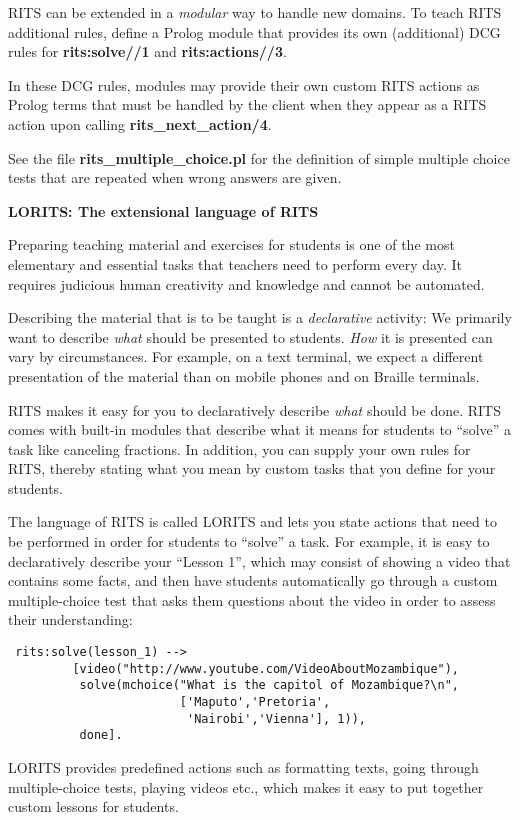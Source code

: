 \documentclass[a4paper,11pt]{article}
\begin{document}
RITS can be extended in a \textit{modular} way to handle new domains.
To teach RITS additional rules, define a Prolog module that provides
its own (additional) DCG rules for \textbf{rits:solve//1} and
\textbf{rits:actions//3}. 

In these DCG rules, modules may provide their own custom RITS actions
as Prolog terms that must be handled by the client when they appear as
a RITS action upon calling \textbf{rits\_next\_action/4}.

See the file \textbf{rits\_multiple\_choice.pl} for the definition of
simple multiple choice tests that are repeated when wrong answers are
given.

\bigskip
\begin{center}
  \large\textbf{LORITS: The extensional language of RITS}
\end{center}

\medskip
\noindent
Preparing teaching material and exercises for students is one of the
most elementary and essential tasks that teachers need to perform
every day. It requires judicious human creativity and knowledge and
cannot be automated.

Describing the material that is to be taught is a \textit{declarative}
activity: We primarily want to describe \textit{what} should be
presented to students. \textit{How} it is presented can vary by
circumstances. For example, on a text terminal, we expect a different
presentation of the material than on mobile phones and on Braille
terminals.

RITS makes it easy for you to declaratively describe \textit{what}
should be done. RITS comes with built-in modules that describe what it
means for students to ``solve'' a task like canceling fractions. In
addition, you can supply your own rules for RITS, thereby stating what
you mean by custom tasks that you define for your students.

The language of RITS is called LORITS and lets you state actions that
need to be performed in order for students to ``solve'' a task. For
example, it is easy to declaratively describe your ``Lesson 1'', which
may consist of showing a video that contains some facts, and then have
students automatically go through a custom multiple-choice test that
asks them questions about the video in order to assess their
understanding:

\begin{verbatim}
 rits:solve(lesson_1) -->
         [video("http://www.youtube.com/VideoAboutMozambique"),
          solve(mchoice("What is the capitol of Mozambique?\n",
                        ['Maputo','Pretoria',
                         'Nairobi','Vienna'], 1)),
          done].
\end{verbatim}

LORITS provides predefined actions such as formatting texts, going
through multiple-choice tests, playing videos etc., which makes it
easy to put together custom lessons for students.

\vfil
\end{document}
